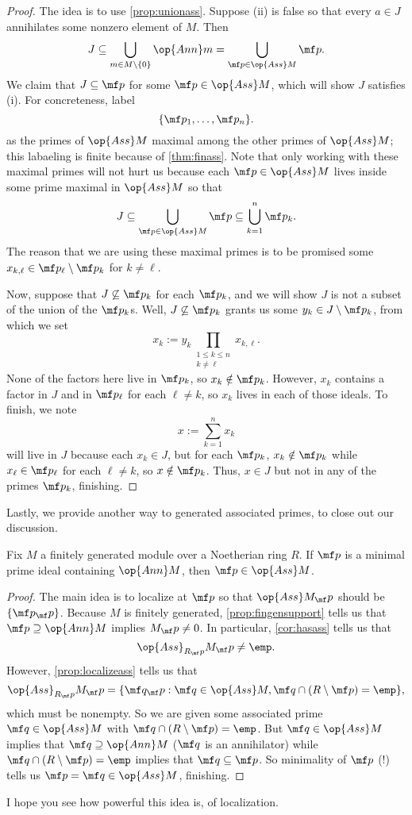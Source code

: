 \begin{proof}
	The idea is to use \autoref{prop:unionass}. Suppose (ii) is false so that every $a\in J$ annihilates some nonzero element of $M$. Then
	\[J\subseteq\bigcup_{m\in M\setminus\{0\}}\op{Ann}m=\bigcup_{\mf p\in\op{Ass}M}\mf p.\]
	We claim that $J\subseteq\mf p$ for some $\mf p\in\op{Ass}M$, which will show $J$ satisfies (i). For concreteness, label
	\[\{\mf p_1,\ldots,\mf p_n\}.\]
	as the primes of $\op{Ass}M$ maximal among the other primes of $\op{Ass}M$; this labaeling is finite because of \autoref{thm:finass}. Note that only working with these maximal primes will not hurt us because each $\mf p\in\op{Ass}M$ lives inside some prime maximal in $\op{Ass}M$ so that
	\[J\subseteq\bigcup_{\mf p\in\op{Ass}M}\mf p\subseteq\bigcup_{k=1}^n\mf p_k.\]
	The reason that we are using these maximal primes is to be promised some $x_{k,\ell}\in\mf p_\ell\setminus\mf p_k$ for $k\ne\ell$.
	
	Now, suppose that $J\not\subseteq\mf p_k$ for each $\mf p_k$, and we will show $J$ is not a subset of the union of the $\mf p_k$s. Well, $J\not\subseteq\mf p_k$ grants us some $y_k\in J\setminus\mf p_k$, from which we set
	\[x_k:=y_k\prod_{\substack{1\le k\le n\\k\ne\ell}}x_{k,\ell}.\]
	None of the factors here live in $\mf p_k$, so $x_k\notin\mf p_k$. However, $x_k$ contains a factor in $J$ and in $\mf p_\ell$ for each $\ell\ne k$, so $x_k$ lives in each of those ideals. To finish, we note
	\[x:=\sum_{k=1}^nx_k\]
	will live in $J$ because each $x_k\in J$, but for each $\mf p_k$, $x_k\notin\mf p_k$ while $x_\ell\in\mf p_\ell$ for each $\ell\ne k$, so $x\notin\mf p_k$. Thus, $x\in J$ but not in any of the primes $\mf p_k$, finishing.
\end{proof}
Lastly, we provide another way to generated associated primes, to close out our discussion.
\begin{prop} \label{prop:minassprimes}
	Fix $M$ a finitely generated module over a Noetherian ring $R$. If $\mf p$ is a minimal prime ideal containing $\op{Ann}M$, then $\mf p\in\op{Ass}M$.
\end{prop}
\begin{proof}
	The main idea is to localize at $\mf p$ so that $\op{Ass}M_\mf p$ should be $\{\mf p_\mf p\}$. Because $M$ is finitely generated, \autoref{prop:fingensupport} tells us that $\mf p\supseteq\op{Ann}M$ implies $M_\mf p\ne0$. In particular, \autoref{cor:hasass} tells us that
	\[\op{Ass}_{R_\mf p}M_\mf p\ne\emp.\]
	However, \autoref{prop:localizeass} tells us that
	\[\op{Ass}_{R_\mf p}M_\mf p=\{\mf q_\mf p:\mf q\in\op{Ass}M,\mf q\cap(R\setminus\mf p)=\emp\},\]
	which must be nonempty. So we are given some associated prime $\mf q\in\op{Ass}M$ with $\mf q\cap(R\setminus\mf p)=\emp$. But $\mf q\in\op{Ass}M$ implies that $\mf q\supseteq\op{Ann}M$ ($\mf q$ is an annihilator) while $\mf q\cap(R\setminus\mf p)=\emp$ implies that $\mf q\subseteq\mf p$. So minimality of $\mf p$ (!) tells us $\mf p=\mf q\in\op{Ass}M$, finishing.
\end{proof}
\begin{quot}
	I hope you see how powerful this idea is, of localization.
\end{quot}

